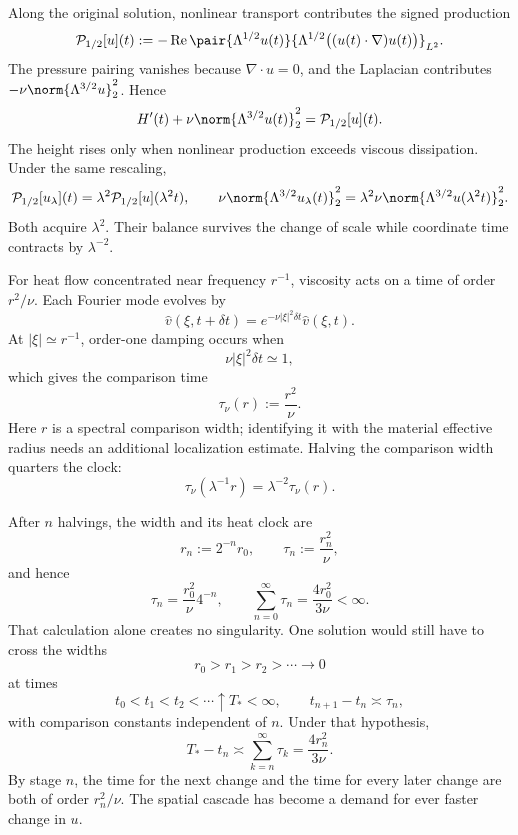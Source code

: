 Along the original solution, nonlinear transport contributes the signed production
\[
  \mathcal P_{1/2}[u](t)
  :=
  -\operatorname{Re}
  \pair
    {\Lambda^{1/2}u(t)}
    {\Lambda^{1/2}\bigl((u(t)\cdot\nabla)u(t)\bigr)}_{L^2}.
\]
The pressure pairing vanishes because \(\nabla\cdot u=0\), and the Laplacian contributes \(-\nu\norm{\Lambda^{3/2}u}_2^2\). Hence
\[
  H'(t)
  +
  \nu\norm{\Lambda^{3/2}u(t)}_2^2
  =
  \mathcal P_{1/2}[u](t).
\]
The height rises only when nonlinear production exceeds viscous dissipation. Under the same rescaling,
\[
  \mathcal P_{1/2}[u_\lambda](t)
  =
  \lambda^2\mathcal P_{1/2}[u](\lambda^2t),
  \qquad
  \nu\norm{\Lambda^{3/2}u_\lambda(t)}_2^2
  =
  \lambda^2\nu\norm{\Lambda^{3/2}u(\lambda^2t)}_2^2.
\]
Both acquire \(\lambda^2\). Their balance survives the change of scale while coordinate time contracts by \(\lambda^{-2}\).


For heat flow concentrated near frequency \(r^{-1}\), viscosity acts on a time of order \(r^2/\nu\). Each Fourier mode evolves by
\[
  \widehat v(\xi,t+\delta t)
  =
  e^{-\nu|\xi|^2\delta t}\widehat v(\xi,t).
\]
At \(|\xi|\simeq r^{-1}\), order-one damping occurs when
\[
  \nu|\xi|^2\delta t\simeq1,
\]
which gives the comparison time
\[
  \tau_\nu(r)
  :=
  \frac{r^2}{\nu}.
\]
Here \(r\) is a spectral comparison width; identifying it with the material effective radius needs an additional localization estimate. Halving the comparison width quarters the clock:
\[
  \tau_\nu(\lambda^{-1}r)
  =
  \lambda^{-2}\tau_\nu(r).
\]


After \(n\) halvings, the width and its heat clock are
\[
  r_n:=2^{-n}r_0,
  \qquad
  \tau_n:=\frac{r_n^2}{\nu},
\]
and hence
\[
  \tau_n
  =
  \frac{r_0^2}{\nu}4^{-n},
  \qquad
  \sum_{n=0}^{\infty}\tau_n
  =
  \frac{4r_0^2}{3\nu}
  <
  \infty.
\]
That calculation alone creates no singularity. One \NavierStokes{} solution would still have to cross the widths
\[
  r_0>r_1>r_2>\cdots\longrightarrow0
\]
at times
\[
  t_0<t_1<t_2<\cdots\uparrow T_*<\infty,
  \qquad
  t_{n+1}-t_n\asymp\tau_n,
\]
with comparison constants independent of \(n\). Under that hypothesis,
\[
  T_*-t_n
  \asymp
  \sum_{k=n}^{\infty}\tau_k
  =
  \frac{4r_n^2}{3\nu}.
\]
By stage \(n\), the time for the next change and the time for every later change are both of order \(r_n^2/\nu\). The spatial cascade has become a demand for ever faster change in \(u\).
